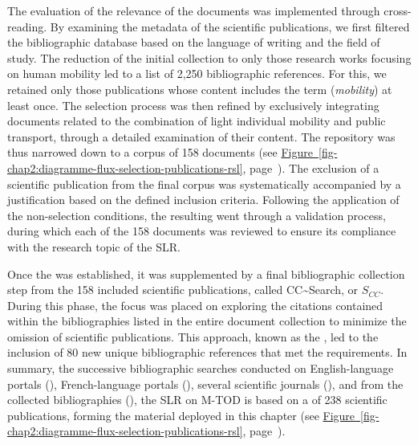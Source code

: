 \begin{refsegment}
The evaluation of the relevance of the documents was implemented through cross-reading. By examining the metadata of the scientific publications, we first filtered the bibliographic database based on the language of writing and the field of study. The reduction of the initial collection to only those research works focusing on human mobility led to a list of 2,250 bibliographic references. For this, we retained only those publications whose content includes the term  (\textsl{mobility}) at least once. The selection process was then refined by exclusively integrating documents related to the combination of light individual mobility and public transport, through a detailed examination of their content. The repository was thus narrowed down to a corpus of 158 documents (see \hyperref[fig-chap2:diagramme-flux-selection-publications-rsl]{Figure~\ref{fig-chap2:diagramme-flux-selection-publications-rsl}}, page~\pageref{fig-chap2:diagramme-flux-selection-publications-rsl}). The exclusion of a scientific publication from the final corpus was systematically accompanied by a justification based on the defined inclusion criteria. Following the application of the non-selection conditions, the resulting  went through a validation process, during which each of the 158 documents was reviewed to ensure its compliance with the research topic of the \acrshort{SLR}.%

Once the  was established, it was supplemented by a final bibliographic collection step from the 158 included scientific publications, called \acrfull{CC~Search}, or \(S_{CC}\). During this phase, the focus was placed on exploring the citations contained within the bibliographies listed in the entire document collection to minimize the omission of scientific publications. This approach, known as the  \textcolor{blue}{\autocite[2545]{jain_systematic_2020}}, led to the inclusion of 80 new unique bibliographic references that met the requirements. In summary, the successive bibliographic searches conducted on English-language portals (), French-language portals (), several scientific journals (), and from the collected bibliographies (), the \acrshort{SLR} on \acrshort{M-TOD} is based on a  of 238 scientific publications, forming the material deployed in this chapter (see \hyperref[fig-chap2:diagramme-flux-selection-publications-rsl]{Figure~\ref{fig-chap2:diagramme-flux-selection-publications-rsl}}, page~\pageref{fig-chap2:diagramme-flux-selection-publications-rsl}).%


\end{refsegment}
